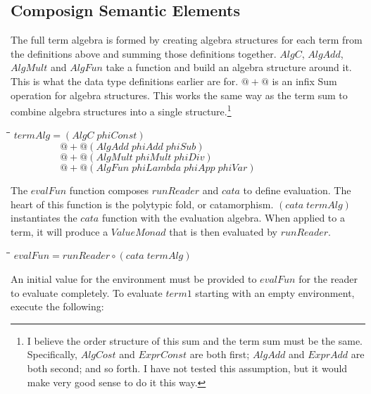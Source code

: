 \documentclass[10pt]{article}
\newlength{\lwidth}\setlength{\lwidth}{4.5cm}
\newlength{\cwidth}\setlength{\cwidth}{8mm} %
\newcommand{\Conid}[1]{\mathit{#1}}
\newcommand{\Varid}[1]{\mathit{#1}}
\begin{document}
\subsection{Composign Semantic Elements}

The full term algebra is formed by creating algebra structures for
each term from the definitions above and summing those definitions
together.  \ensuremath{\Conid{AlgC}}, \ensuremath{\Conid{AlgAdd}}, \ensuremath{\Conid{AlgMult}} and \ensuremath{\Conid{AlgFun}} take a function
and build an algebra structure around it.  This is what the data type
definitions earlier are for.  \ensuremath{\mathbin{@+@}} is an infix Sum operation for
algebra structures.  This works the same way as the term sum to
combine algebra structures into a single structure.\footnote{I believe
  the order structure of this sum and the term sum must be the same.
  Specifically, \ensuremath{\Conid{AlgCost}} and \ensuremath{\Conid{ExprConst}} are both first; \ensuremath{\Conid{AlgAdd}} and
  \ensuremath{\Conid{ExprAdd}} are both second; and so forth.  I have not tested this
  assumption, but it would make very good sense to do it this way.}

\begin{tabbing}
\qquad\=\hspace{\lwidth}\=\hspace{\cwidth}\=\+\kill
${\Varid{termAlg}\mathrel{=}(\Conid{AlgC}\;\Varid{phiConst})}$\\
${\phantom{\Varid{termAlg}\mathrel{=}\mbox{}}\mathbin{@+@}(\Conid{AlgAdd}\;\Varid{phiAdd}\;\Varid{phiSub})}$\\
${\phantom{\Varid{termAlg}\mathrel{=}\mbox{}}\mathbin{@+@}(\Conid{AlgMult}\;\Varid{phiMult}\;\Varid{phiDiv})}$\\
${\phantom{\Varid{termAlg}\mathrel{=}\mbox{}}\mathbin{@+@}(\Conid{AlgFun}\;\Varid{phiLambda}\;\Varid{phiApp}\;\Varid{phiVar})}$
\end{tabbing}
The \ensuremath{\Varid{evalFun}} function composes \ensuremath{\Varid{runReader}} and \ensuremath{\Varid{cata}} to define
evaluation.  The heart of this function is the polytypic fold, or
catamorphism.  \ensuremath{(\Varid{cata}\;\Varid{termAlg})} instantiates the \ensuremath{\Varid{cata}} function with
the evaluation algebra.  When applied to a term, it will produce a
\ensuremath{\Conid{ValueMonad}} that is then evaluated by \ensuremath{\Varid{runReader}}.  

\begin{tabbing}
\qquad\=\hspace{\lwidth}\=\hspace{\cwidth}\=\+\kill
${\Varid{evalFun}\mathrel{=}\Varid{runReader}\mathbin{\circ}(\Varid{cata}\;\Varid{termAlg})}$
\end{tabbing}
An initial value for the environment must be provided to \ensuremath{\Varid{evalFun}} for
the reader to evaluate completely.  To evaluate \ensuremath{\Varid{term1}} starting with
an empty environment, execute the following:
\end{document}
